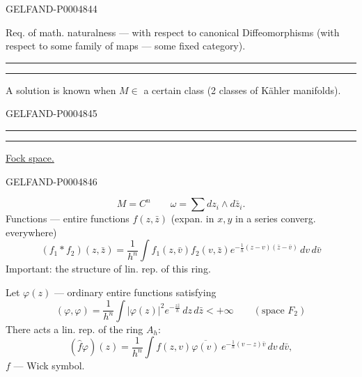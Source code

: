 \begin{GelfandAdjacentEvidence}{GELFAND-P000484}{4}


Req. of math. naturalness —  with respect to canonical
Diffeomorphisms (with respect to some family of maps — some fixed category).

{\centering\rule{1.9em}{.4pt}\quad\textperiodcentered\quad\rule{1.9em}{.4pt}\par}

A solution is known when $M\in$ a certain class
(2 classes of Kähler manifolds).

\begingroup\color{black}\endgroup
{}
\end{GelfandAdjacentEvidence}
\begin{GelfandAdjacentEvidence}{GELFAND-P000484}{5}


{\centering\rule{1.9em}{.7pt}\quad\textbullet\quad\rule{1.9em}{.7pt}\par}

\uline{Fock space.}
\end{GelfandAdjacentEvidence}
\begin{GelfandAdjacentEvidence}{GELFAND-P000484}{6}

\[
M=C^n\qquad\omega=\sum dz_i\wedge d\bar z_i.
\]
Functions — entire functions $f(z,\bar z)$ (expan. in $x,y$ in a series converg. everywhere)
\[
(f_1\ast f_2)(z,\bar z)=\frac1{h^n}
\int f_1(z,\bar v)f_2(v,\bar z)
 e^{-\frac1h(z-v)(\bar z-\bar v)}\,dv\,d\bar v
\]
Important: the structure of lin. rep. of this ring.

Let $\varphi(z)$ — ordinary entire functions satisfying
\[
(\varphi,\varphi)=\frac1{h^n}
\int|\varphi(z)|^2e^{-\frac{z\bar z}{h}}\,dz\,d\bar z
<+\infty\qquad(\text{space }F_2)
\]
There acts a lin. rep. of the ring $A_h$:
\[
(\hat f\varphi)(z)=\frac1{h^n}\int
 f(z,v)\overline{\varphi(v)}\,
 e^{-\frac1h(v-z)\bar v}\,dv\,d\bar v,
\]
$f$ — Wick symbol.
\end{GelfandAdjacentEvidence}
